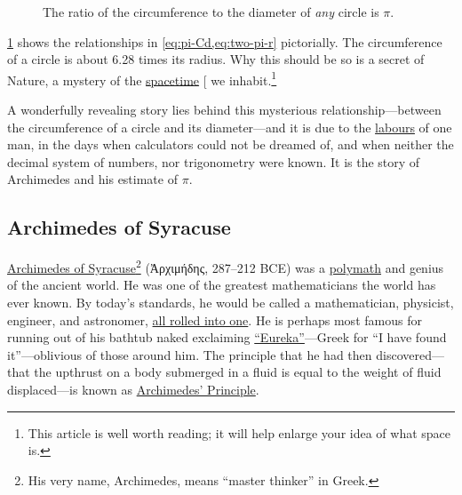 \documentclass[
  a4paper,
]{article}
\begin{document}
\begin{figure}
\centering

\caption{The ratio of the circumference to the diameter of \emph{any}
circle is \(\pi\).}\label{fig:pi-circle}
\end{figure}

\cref{fig:pi-circle} shows the relationships in
\cref{eq:pi-Cd,eq:two-pi-r} pictorially. The circumference of a circle
is about 6.28 times its radius. Why this should be so is a secret of
Nature, a mystery of the
\href{https://www.nature.com/articles/d41586-018-05095-z}{spacetime}
{[}\citeproc{ref-musser2018}{1}{]} we inhabit.\footnote{This article is
  well worth reading; it will help enlarge your idea of what space is.}

A wonderfully revealing story lies behind this mysterious
relationship---between the circumference of a circle and its
diameter---and it is due to the
\href{https://www.collinsdictionary.com/dictionary/english/labours}{labours}
of one man, in the days when calculators could not be dreamed of, and
when neither the decimal system of numbers, nor trigonometry were known.
It is the story of Archimedes and his estimate of \(\pi\).

\subsection{Archimedes of Syracuse}\label{archimedes-of-syracuse}

\href{https://en.wikipedia.org/wiki/Archimedes}{Archimedes of
Syracuse}\footnote{His very name, Archimedes, means ``master thinker''
  in Greek.} (Ἀρχιμήδης, 287--212 BCE) was a
\href{https://www.vocabulary.com/dictionary/polymath\#:~:text=Definitions\%20of\%20polymath,of\%20great\%20and\%20varied\%20learning}{polymath}
and genius of the ancient world. He was one of the greatest
mathematicians the world has ever known. By today's standards, he would
be called a mathematician, physicist, engineer, and astronomer,
\href{https://www.ldoceonline.com/dictionary/all-rolled-into-one}{all
rolled into one}. He is perhaps most famous for running out of his
bathtub naked exclaiming
\href{https://www.dictionary.com/browse/eureka}{``Eureka''}---Greek for
``I have found it''---oblivious of those around him. The principle that
he had then discovered---that the upthrust on a body submerged in a
fluid is equal to the weight of fluid displaced---is known as
\href{https://www.britannica.com/science/Archimedes-principle}{Archimedes'
Principle}.
\end{document}
